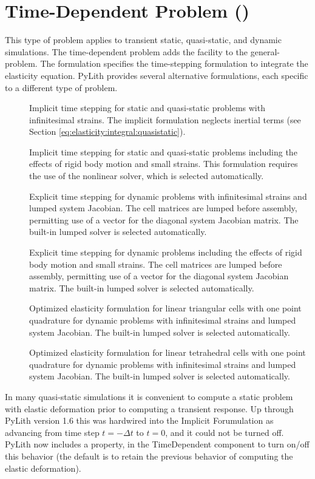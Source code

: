 \section{Time-Dependent Problem ()}

This type of problem applies to transient static, quasi-static, and
dynamic simulations. The time-dependent problem adds the
 facility to the general-problem. The
formulation specifies the time-stepping formulation to integrate the
elasticity equation. PyLith provides several alternative formulations,
each specific to a different type of problem.
\begin{description}
\item[] Implicit time stepping for static and
   quasi-static problems with infinitesimal strains. The implicit
   formulation neglects inertial terms (see Section
   \vref{eq:elasticity:integral:quasistatic}).
\item[] Implicit time stepping for static
  and quasi-static problems including the effects of rigid body motion
  and small strains.  This formulation requires the use of the
  nonlinear solver, which is selected automatically.
\item[] Explicit time stepping for dynamic problems
  with infinitesimal strains and lumped system Jacobian. The cell
  matrices are lumped before assembly, permitting use of a vector for
  the diagonal system Jacobian matrix. The built-in lumped solver is
  selected automatically.
\item[] Explicit time stepping for dynamic
  problems including the effects of rigid body motion and small
  strains. The cell matrices are lumped before assembly, permitting
  use of a vector for the diagonal system Jacobian matrix. The
  built-in lumped solver is selected automatically.
\item[] Optimized elasticity formulation for
  linear triangular cells with one point quadrature for dynamic
  problems with infinitesimal strains and lumped system Jacobian. The
  built-in lumped solver is selected automatically.
\item[] Optimized elasticity formulation for
  linear tetrahedral cells with one point quadrature for dynamic
  problems with infinitesimal strains and lumped system Jacobian. The
  built-in lumped solver is selected automatically.
\end{description}
In many quasi-static simulations it is convenient to compute a static
problem with elastic deformation prior to computing a transient response.
Up through PyLith version 1.6 this was hardwired into the Implicit
Forumulation as advancing from time step $t=-\Delta t$ to $t=0$,
and it could not be turned off. PyLith now includes a property, 
in the TimeDependent component to turn on/off this behavior (the default
is to retain the previous behavior of computing the elastic deformation).

